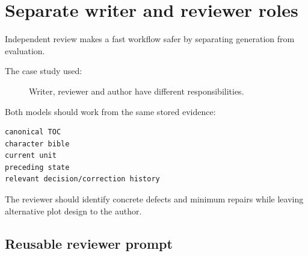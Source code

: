 \documentclass[11pt,oneside,openany]{book}
\begin{document}
\chapter{Separate writer and reviewer roles}

Independent review makes a fast workflow safer by separating generation from evaluation.

The case study used:

\begin{figure}[htbp]
\centering
{}
\caption{Writer, reviewer and author have different responsibilities.}
\end{figure}

Both models should work from the same stored evidence:

\begin{lstlisting}
canonical TOC
character bible
current unit
preceding state
relevant decision/correction history
\end{lstlisting}

The reviewer should identify concrete defects and minimum repairs while leaving alternative plot design to the author.

\section{Reusable reviewer prompt}\label{reusable-reviewer-prompt}
\end{document}
